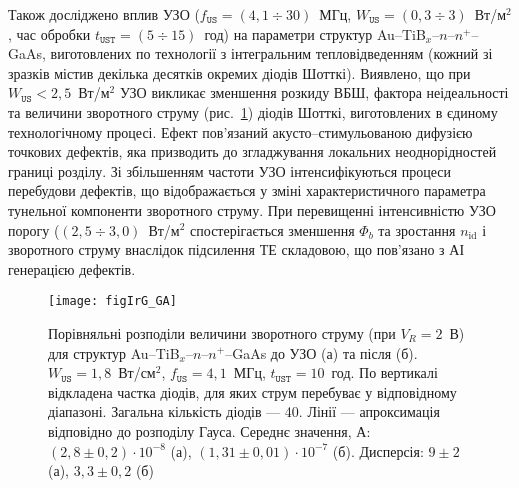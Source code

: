 Також досліджено вплив УЗО
($f_\mathtt{US}=(4,1\div30)$~МГц, $W_\mathtt{US}=(0,3\div3)$~Вт/м$^2$, час обробки $t_\mathtt{UST}=(5\div15)$~год) на параметри структур
Au--TiB$_x$--$n$--$n^+$--GaAs, виготовлених
по технології з інтегральним тепловідведенням (кожний зі зразків містив декілька десятків окремих діодів Шотткі).
Виявлено, що при $W_\mathtt{US}<2,5$~Вт/м$^2$ УЗО викликає зменшення розкиду ВБШ, фактора неідеальності та величини зворотного струму (рис.~\ref{figIrG_GA})
діодів Шотткі, виготовлених в єдиному технологічному процесі.
Ефект пов'язаний акусто--стимульованою дифузією точкових дефектів, яка призводить до згладжування локальних неоднорідностей границі розділу.
Зі збільшенням частоти УЗО інтенсифікуються процеси перебудови дефектів, що відображається у зміні характеристичного  параметра тунельної компоненти зворотного
струму.
При перевищенні інтенсивністю УЗО порогу ($(2,5\div3,0)$~Вт/м$^2$ спостерігається зменшення $\Phi_b$ та зростання $n_\mathrm{id}$ і зворотного струму внаслідок підсилення ТЕ складовою, що пов'язано з АІ генерацією дефектів.

\begin{figure}
\center
\texttt{[image: figIrG\_GA]}%
\caption{\label{figIrG_GA}
Порівняльні розподіли величини зворотного струму (при $V_R=2$~В)
для структур Au--TiB$_x$--$n$--$n^+$--GaAs до УЗО (а) та після (б).
$W_\mathtt{US}=1,8$~Вт/см$^2$, $f_\mathtt{US}=4,1$~МГц, $t_\mathtt{UST}=10$~год.
По вертикалі відкладена частка діодів, для яких струм перебуває у відповідному діапазоні.
Загальна кількість діодів --- 40.
Лінії --- апроксимація відповідно до розподілу Гауса.
Середнє значення, А:
$(2,8\pm0,2)\cdot10^{-8}$ (а),
$(1,31\pm0,01)\cdot10^{-7}$ (б).
Дисперсія:
$9\pm2$ (а),
$3,3\pm0,2$ (б)
}
\end{figure}

